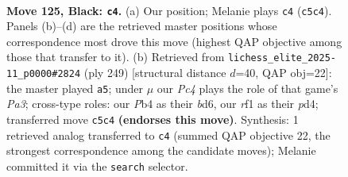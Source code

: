 \documentclass[11pt]{article}
\begin{document}
\begin{figure}[p]\centering
\begin{subfigure}{0.46\textwidth}\centering
\resizebox{\linewidth}{!}{%
\newchessgame
\chessboard[
  setfen={7k/8/p5r1/P1p2p1p/1p3P1P/1P2PKP1/8/5R2 b - - 38 125},
  showmover=false,
  pgfstyle=straightmove, color=movearrow, markmove={c5-c4}
]}
\caption{}
\end{subfigure}\hfill
\begin{subfigure}{0.46\textwidth}\centering
\resizebox{\linewidth}{!}{%
\newchessgame
\chessboard[
  setfen={4k3/6p1/p2B1p1p/1p1p1P1P/3P2PK/P1P5/8/3b4 b - - 42 125},
  showmover=false,
  pgfstyle=straightmove, color=movearrow, markmove={a6-a5}
]}
\caption{}
\end{subfigure}
\\[4pt]

\caption{\textbf{Move 125, Black: \texttt{c4}.} (a) Our position; Melanie plays \texttt{c4} (\texttt{c5c4}). Panels (b)--(d) are the retrieved master positions whose correspondence most drove this move (highest QAP objective among those that transfer to it). (b) Retrieved from \texttt{lichess\_elite\_2025-11\_p0000\#2824} (ply 249) [structural distance $d$=40, QAP obj=22]: the master played \texttt{a5}; under $\mu$ our \emph{Pc4} plays the role of that game's \emph{Pa3}; cross-type roles: our \emph{P}b4 as their \emph{b}d6, our \emph{r}f1 as their \emph{p}d4; transferred move \texttt{c5c4} \textbf{(endorses this move)}. Synthesis: 1 retrieved analog transferred to \texttt{c4} (summed QAP objective 22, the strongest correspondence among the candidate moves); Melanie committed it via the \texttt{search} selector.}
\label{fig:thought-m249}
\end{figure}
\end{document}

